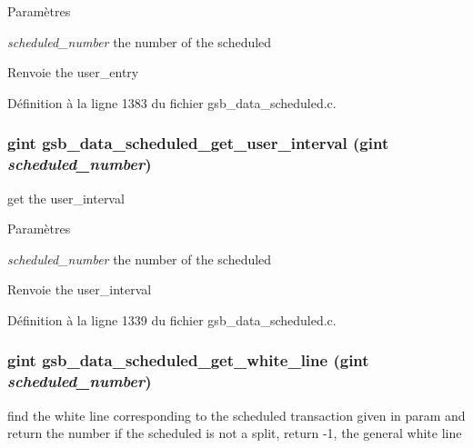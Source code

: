 \begin{DoxyParams}{Paramètres}
\item[{\em scheduled\_\-number}]the number of the scheduled\end{DoxyParams}
\begin{DoxyReturn}{Renvoie}
the user\_\-entry 
\end{DoxyReturn}


Définition à la ligne 1383 du fichier gsb\_\-data\_\-scheduled.c.

\subsubsection[{gsb\_\-data\_\-scheduled\_\-get\_\-user\_\-interval}]{\setlength{\rightskip}{0pt plus 5cm}gint gsb\_\-data\_\-scheduled\_\-get\_\-user\_\-interval (gint {\em scheduled\_\-number})}\label{gsb__data__scheduled_8c_aaf1176d8c782270fe8e4eec21937bf05}
get the user\_\-interval


\begin{DoxyParams}{Paramètres}
\item[{\em scheduled\_\-number}]the number of the scheduled\end{DoxyParams}
\begin{DoxyReturn}{Renvoie}
the user\_\-interval 
\end{DoxyReturn}


Définition à la ligne 1339 du fichier gsb\_\-data\_\-scheduled.c.

\subsubsection[{gsb\_\-data\_\-scheduled\_\-get\_\-white\_\-line}]{\setlength{\rightskip}{0pt plus 5cm}gint gsb\_\-data\_\-scheduled\_\-get\_\-white\_\-line (gint {\em scheduled\_\-number})}\label{gsb__data__scheduled_8c_aac0788953cfa89ce5393e02e2b22d655}
find the white line corresponding to the scheduled transaction given in param and return the number if the scheduled is not a split, return -\/1, the general white line


